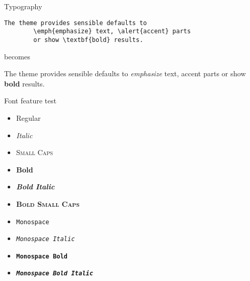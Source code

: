 \documentclass{kw}
\begin{document}
\begin{frame}[fragile]{Typography}
	\begin{verbatim}The theme provides sensible defaults to
        \emph{emphasize} text, \alert{accent} parts
        or show \textbf{bold} results.\end{verbatim}
	\begin{center}becomes\end{center}
	
	The theme provides sensible defaults to \emph{emphasize} text,
	\alert{accent} parts or show \textbf{bold} results.
\end{frame}

\begin{frame}{Font feature test}
	\begin{itemize}
		\item Regular
		\item \textit{Italic}
		\item \textsc{Small Caps}
		\item \textbf{Bold}
		\item \textbf{\textit{Bold Italic}}
		\item \textbf{\textsc{Bold Small Caps}}
		\item \texttt{Monospace}
		\item \texttt{\textit{Monospace Italic}}
		\item \texttt{\textbf{Monospace Bold}}
		\item \texttt{\textbf{\textit{Monospace Bold Italic}}}
	\end{itemize}
\end{frame}
\end{document}
